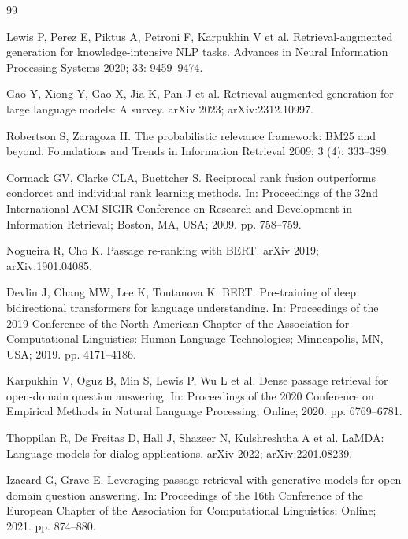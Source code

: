\documentclass[11pt,a4paper]{article}
\begin{document}
\begin{thebibliography}{99}

Lewis P, Perez E, Piktus A, Petroni F, Karpukhin V et al.
Retrieval-augmented generation for knowledge-intensive NLP tasks.
Advances in Neural Information Processing Systems 2020; 33: 9459--9474.

Gao Y, Xiong Y, Gao X, Jia K, Pan J et al.
Retrieval-augmented generation for large language models: A survey.
arXiv 2023; arXiv:2312.10997.

Robertson S, Zaragoza H.
The probabilistic relevance framework: BM25 and beyond.
Foundations and Trends in Information Retrieval 2009; 3 (4): 333--389.

Cormack GV, Clarke CLA, Buettcher S.
Reciprocal rank fusion outperforms condorcet and individual rank learning methods.
In: Proceedings of the 32nd International ACM SIGIR Conference on Research and Development in Information Retrieval; Boston, MA, USA; 2009. pp. 758--759.

Nogueira R, Cho K.
Passage re-ranking with BERT.
arXiv 2019; arXiv:1901.04085.

Devlin J, Chang MW, Lee K, Toutanova K.
BERT: Pre-training of deep bidirectional transformers for language understanding.
In: Proceedings of the 2019 Conference of the North American Chapter of the Association for Computational Linguistics: Human Language Technologies; Minneapolis, MN, USA; 2019. pp. 4171--4186.

Karpukhin V, Oguz B, Min S, Lewis P, Wu L et al.
Dense passage retrieval for open-domain question answering.
In: Proceedings of the 2020 Conference on Empirical Methods in Natural Language Processing; Online; 2020. pp. 6769--6781.

Thoppilan R, De Freitas D, Hall J, Shazeer N, Kulshreshtha A et al.
LaMDA: Language models for dialog applications.
arXiv 2022; arXiv:2201.08239.

Izacard G, Grave E.
Leveraging passage retrieval with generative models for open domain question answering.
In: Proceedings of the 16th Conference of the European Chapter of the Association for Computational Linguistics; Online; 2021. pp. 874--880.

\end{thebibliography}
\end{document}
